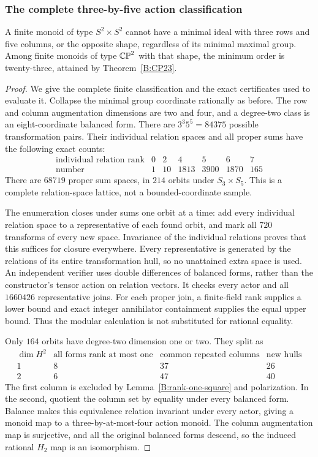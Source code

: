 \subsubsection{The complete three-by-five action classification}

\begin{theorem}\label{B:three-by-five-targets}
A finite monoid of type $S^2\times S^2$ cannot have a minimal
ideal with three rows and five columns, or the opposite shape,
regardless of its minimal maximal group.
Among finite monoids of type $\mathbb {CP}^2$ with that shape, the minimum
order is twenty-three, attained by Theorem~\ref{B:CP23}.
\end{theorem}

\begin{proof}
We give the complete finite classification and the exact certificates
used to evaluate it.  Collapse the minimal group coordinate rationally
as before.  The row and column augmentation dimensions are two and four,
and a degree-two class is an eight-coordinate balanced form.  There are
$3^3 5^5=84375$ possible transformation pairs.
Their individual relation spaces and all proper sums have the following
exact counts:
\[
\begin{array}{c|rrrrrr}
\text{individual relation rank}&0&2&4&5&6&7\\\hline
\text{number}&1&10&1813&3900&1870&165
\end{array}
\]
There are $68719$ proper sum spaces, in $214$ orbits under
$S_3\times S_5$.  This is a complete relation-space lattice,
not a bounded-coordinate sample.

The enumeration closes under sums one orbit at a time: add every
individual relation space to a representative of each found orbit,
and mark all $720$ transforms of every new space.  Invariance of the
individual relations proves that this suffices for closure everywhere.
Every representative is generated by the relations of its entire
transformation hull, so no unattained extra space is used.
An independent verifier uses double differences of balanced forms,
rather than the constructor's tensor action on relation vectors.
It checks every actor and all $1660426$ representative joins.
For each proper join, a finite-field rank supplies a lower bound and
exact integer annihilator containment supplies the equal upper bound.
Thus the modular calculation is not substituted for rational equality.

Only $164$ orbits have degree-two dimension one or two.  They split as
\[
\begin{array}{c|rrr}
\dim H^2&\text{all forms rank at most one}&
 \text{common repeated columns}&\text{new hulls}\\\hline
1&8&37&26\\
2&6&47&40
\end{array}
\]
The first column is excluded by Lemma~\ref{B:rank-one-square}
and polarization.  In the second, quotient the column set by equality
under every balanced form.  Balance makes this equivalence relation
invariant under every actor, giving a monoid map to a three-by-at-most-four
action monoid.  The column augmentation map is surjective, and all the
original balanced forms descend, so the induced rational $H_2$ map is
an isomorphism.


\end{proof}
